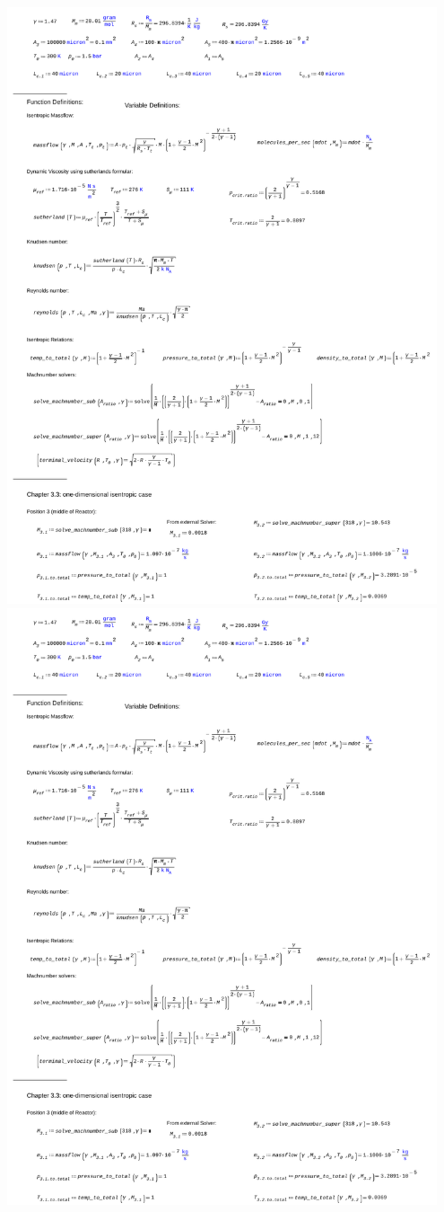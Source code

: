 \includegraphics[page=2, width=0.95\textwidth]{code/calculations_thesis.pdf}
\newpage
\includegraphics[page=3, width=0.95\textwidth]{code/calculations_thesis.pdf}
